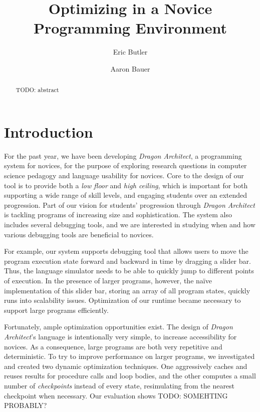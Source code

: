 \documentclass{sig-alternate}
\newcommand{\da}{\emph{Dragon Architect}}
\newcommand{\todo}[1]{{\color{red} TODO: #1}}
\begin{document}
\title{Optimizing in a Novice Programming Environment}
\author{Eric Butler \and Aaron Bauer}
\maketitle{}

\begin{abstract}
\todo{abstract}
\end{abstract}

\section{Introduction}

For the past year, we have been developing \da, a programming system for novices, for the purpose of exploring research questions in computer science pedagogy and language usability for novices. Core to the design of our tool is to provide both a \emph{low floor} and \emph{high ceiling}, which is important for both supporting a wide range of skill levels, and engaging students over an extended progression. Part of our vision for students' progression through \da{} is tackling programs of increasing size and sophistication. The system also includes several debugging tools, and we are interested in studying when and how various debugging tools are beneficial to novices. 

For example, our system supports debugging tool that allows users to move the program execution state forward and backward in time by dragging a slider bar. Thus, the language simulator needs to be able to quickly jump to different points of execution. In the presence of larger programs, however, the na\"{i}ve implementation of this slider bar, storing an array of all program states, quickly runs into scalability issues. Optimization of our runtime became necessary to support large programs efficiently. 

Fortunately, ample optimization opportunities exist. The design of \da{}'s language is intentionally very simple, to increase accessibility for novices. As a consequence, large programs are both very repetitive and deterministic. To try to improve performance on larger programs, we investigated and created two dynamic optimization techniques. One aggressively caches and reuses results for procedure calls and loop bodies, and the other computes a small number of \emph{checkpoints} instead of every state, resimulating from the nearest checkpoint when necessary. Our evaluation shows \todo{SOMEHTING PROBABLY?}
\end{document}

